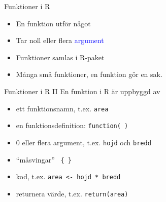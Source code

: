 \documentclass[
  10pt,
  ignorenonframetext,
]{beamer}
\providecommand{\tightlist}{%
  \setlength{\itemsep}{0pt}\setlength{\parskip}{0pt}}
\begin{document}
\begin{frame}{Funktioner i R}
\protect\hypertarget{funktioner-i-r}{}
\begin{itemize}
\tightlist
\item
  En funktion utför något
\item
  Tar noll eller flera \textcolor{blue}{argument}
\item
  Funktioner samlas i R-paket
\item
  Många små funktioner, en funktion gör en sak.
\end{itemize}
\end{frame}

\begin{frame}{Funktioner i R II}
\protect\hypertarget{funktioner-i-r-ii}{}
En funktion i R är uppbyggd av

\begin{itemize}
\tightlist
\item
  ett funktionsnamn, t.ex. \texttt{area}
\item
  en funktionsdefinition: \texttt{function( )}
\item
  0 eller flera argument, t.ex. \texttt{hojd} och \texttt{bredd}
\item
  ``måsvingar'' \texttt{ \{ \} }
\item
  kod, t.ex. \texttt{area <- hojd * bredd}
\item
  returnera värde, t.ex. \texttt{return(area)}
\end{itemize}
\end{frame}
\end{document}
